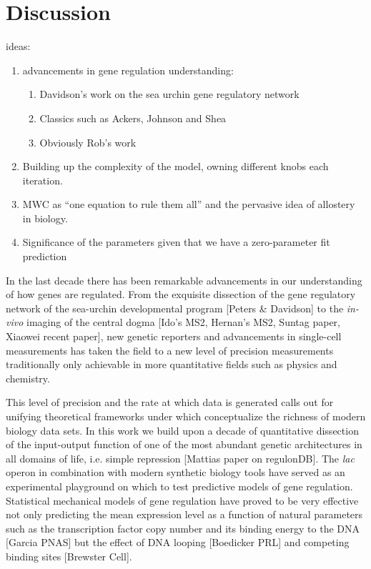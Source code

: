 \pagebreak
\section*{Discussion }

ideas:
\begin{enumerate}
  \item advancements in gene regulation understanding:
    \begin{enumerate}
      \item Davidson's work on the sea urchin gene regulatory network
      \item Classics such as Ackers, Johnson and Shea
      \item Obviously Rob's work
    \end{enumerate}
  \item Building up the complexity of the model, owning different knobs each
  iteration.
  \item MWC as ``one equation to rule them all'' and the pervasive idea of
  allostery in biology.
  \item Significance of the parameters given that we have a zero-parameter fit
  prediction
\end{enumerate}

In the last decade there has been remarkable advancements in our  understanding of how genes are regulated. From the exquisite dissection of the gene regulatory network of the sea-urchin developmental program [Peters & Davidson] to the \textit{in-vivo}  imaging of the central dogma [Ido's MS2, Hernan's MS2, Suntag paper, Xiaowei recent paper], new genetic reporters and  advancements in single-cell measurements has taken the field to a new level of precision measurements traditionally only achievable in more quantitative fields such as physics and chemistry.

This level of precision and the rate at which data is generated calls out for unifying theoretical frameworks under which conceptualize the richness of modern biology data sets. In this work we build upon a decade of quantitative dissection of the input-output function of one of the most abundant genetic architectures in all domains of life, i.e. simple repression [Mattias paper on regulonDB]. The \textit{lac} operon in combination with modern synthetic biology tools have served as an experimental playground on which to test predictive models of gene regulation. Statistical mechanical models of gene regulation have proved to be very effective not only predicting the mean expression level as a function of natural parameters such as the transcription factor copy number and its binding energy to the DNA [Garcia PNAS] but the effect of DNA looping [Boedicker PRL] and competing binding sites [Brewster Cell].

